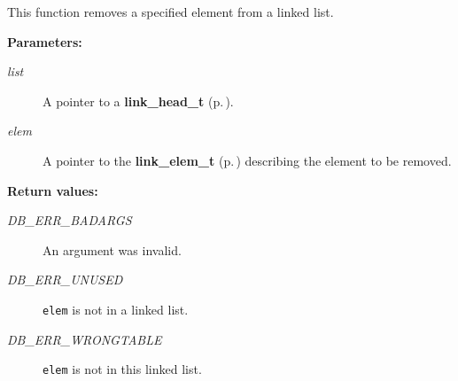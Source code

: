  This function removes a specified element from a linked list.\begin{Desc}
\item[{\bf Parameters: }]\par
\begin{description}
\item[
{\em list}]A pointer to a {\bf link\_\-head\_\-t} {\rm (p.\,\pageref{group__dbprim__link_a0})}. \item[
{\em elem}]A pointer to the {\bf link\_\-elem\_\-t} {\rm (p.\,\pageref{group__dbprim__link_a1})} describing the element to be removed.\end{description}
\end{Desc}
\begin{Desc}
\item[{\bf Return values: }]\par
\begin{description}
\item[
{\em DB\_\-ERR\_\-BADARGS}]An argument was invalid. \item[
{\em DB\_\-ERR\_\-UNUSED}]{\tt elem} is not in a linked list. \item[
{\em DB\_\-ERR\_\-WRONGTABLE}]{\tt elem} is not in this linked list. \end{description}
\end{Desc}
